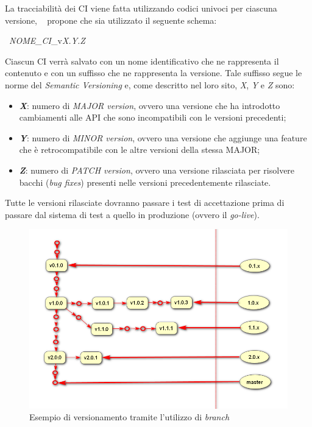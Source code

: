 	La tracciabilità dei CI viene fatta utilizzando codici univoci per ciascuna versione, \azienda~ propone che sia utilizzato il seguente schema:
	
	\begin{center}
		\vspace{-2mm}
		{\Large~\textit{NOME\_CI}\_v\textit{X.Y.Z}}
		\vspace{-2mm}
	\end{center}
	
	Ciascun CI verrà salvato con un nome identificativo che ne rappresenta il contenuto e con un suffisso che ne rappresenta la versione.
	Tale suffisso segue le norme del \textit{Semantic Versioning}\cite{semantic} e, come descritto nel loro sito, \textit{X}, \textit{Y} e \textit{Z} sono:
	
	\begin{itemize}[noitemsep]
		\item \textbf{\textit{X}}: numero di \textit{MAJOR version}, ovvero una versione che ha introdotto cambiamenti alle API che sono incompatibili con le versioni precedenti;
		\item \textit{\textbf{Y}}: numero di \textit{MINOR version}, ovvero una versione che aggiunge una feature che è retrocompatibile con le altre versioni della stessa MAJOR;
		\item \textit{\textbf{Z}}: numero di \textit{PATCH version}, ovvero una versione rilasciata per risolvere bacchi (\textit{bug fixes}) presenti nelle versioni precedentemente rilasciate.
	\end{itemize}
	
	Tutte le versioni rilasciate dovranno passare i test di accettazione prima di passare dal sistema di test a quello in produzione (ovvero il \textit{go-live}).
	
	\begin{figure}[h!]
		\centering
		\includegraphics[width=\linewidth]{img/branches.png}
		\caption{Esempio di versionamento tramite l'utilizzo di \textit{branch}}
		\label{fig:branches}
	\end{figure}

